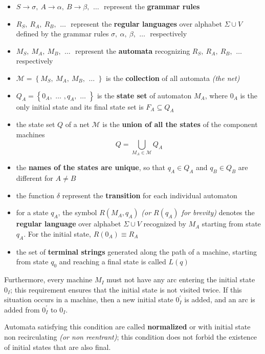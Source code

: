 \documentclass[english]{article}
\begin{document}
\begin{itemize}
  \item \(S \rightarrow \sigma, \ A \rightarrow \alpha, \ B \rightarrow \beta, \ \,\ldots\, \,\) represent the \textbf{grammar rules}
  \item \(R_S, \ R_A, \ R_B, \ \,\ldots\, \,\) represent the \textbf{regular languages} over alphabet \(\Sigma \cup V\) defined by the grammar rules \(\sigma, \ \alpha, \ \beta, \ \,\ldots\, \,\) respectively
  \item \(M_S, \ M_A, \ M_B, \ \,\ldots\, \,\) represent the \textbf{automata} recognizing \(R_S, \ R_A, \ R_B, \ \,\ldots\, \,\) respectively
  \item \(\mathcal{M} = \left\{ M_S, \ M_A, \ M_B, \ \,\ldots\, \, \right\}\) is the \textbf{collection} of all automata \textit{(the net)}
  \item \(Q_A = \left\{ 0_A, \, \,\ldots\, \, , q_A, \, \,\ldots\, \, \right\}\) is the \textbf{state set} of automaton \(M_A\), where \(0_A\) is the only initial state and its final state set is \(F_A \subseteq Q_A\)
  \item the state set \(Q\) of a net \(\mathcal{M}\) is the \textbf{union of all the states} of the component machines \[Q = \displaystyle \bigcup_{M_A \in \mathcal{M}} Q_A\]
  \item the \textbf{names of the states are unique}, so that \(q_A \in Q_A\) and \(q_B \in Q_B\) are different for \(A \neq B\)
  \item the function \(\delta\) represent the \textbf{transition} for each individual automaton
  \item for a state \(q_A\), the symbol \(R (M_A, q_A)\) \textit{(or \(R(q_A)\) for brevity)} denotes the \textbf{regular language} over alphabet \(\Sigma \cup V\) recognized by \(M_A\) starting from state \(q_A\). For the initial state, \(R(0_A) \equiv R_A\)
  \item the set of \textbf{terminal strings} generated along the path of a machine, starting from state \(q_0\) and reaching a final state is called \(L(q)\)
\end{itemize}

Furthermore, every machine \(M_I\) must not have any arc entering the initial state \(0_I\); this requirement ensures that the initial state is not visited twice.
If this situation occurs in a machine, then a new initial state \(0_I^\prime\) is added, and an arc is added from \(0^\prime_I\) to \(0_I\).

Automata satisfying this condition are called \textbf{normalized} or with initial state non recirculating \textit{(or non reentrant)};
this condition does not forbid the existence of initial states that are also final.
\end{document}
